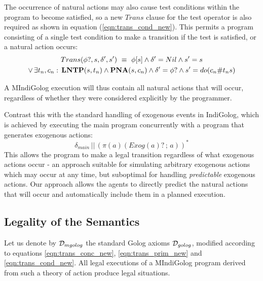 The occurrence of natural actions may also cause test conditions within
the program to become satisfied, so a new $Trans$ clause for the
test operator is also required as shown in equation (\ref{eqn:trans_cond_new}).
This permits a program consisting of a single test condition to make
a transition if the test is satisfied, or a natural action occurs:
\begin{multline}
Trans(\phi?,s,\delta',s')\,\,\equiv\,\,\phi[s]\wedge\delta'=Nil\wedge s'=s\\
\vee\,\exists t_{n},c_{n}:\,\mathbf{LNTP}(s,t_{n})\wedge\mathbf{PNA}(s,c_{n})\wedge\delta'=\phi?\wedge s'=do(c_{n}\#t_{n}s)\label{eqn:trans_cond_new}\end{multline}


A MIndiGolog execution will thus contain all natural actions that
will occur, regardless of whether they were considered explicitly
by the programmer.

Contrast this with the standard handling of exogenous events in IndiGolog,
which is achieved by executing the main program concurrently with
a program that generates exogenous actions:\[
\delta_{main}\,||\,\left(\pi(a)(Exog(a)?\,;\, a)\right)^{*}\]
 This allows the program to make a legal transition regardless of
what exogenous actions occur - an approach suitable for simulating
arbitrary exogenous actions which may occur at any time, but suboptimal
for handling \emph{predictable} exogenous actions. Our approach allows
the agents to directly predict the natural actions that will occur
and automatically include them in a planned execution.


\subsection{Legality of the Semantics}

Let us denote by $\mathcal{D}_{mgolog}$ the standard Golog axioms $\mathcal{D}_{golog}$,
modified according to equations \eqref{eqn:trans_conc_new}, \eqref{eqn:trans_prim_new}
and \eqref{eqn:trans_cond_new}. All legal executions of a MIndiGolog
program derived from such a theory of action produce legal situations.

